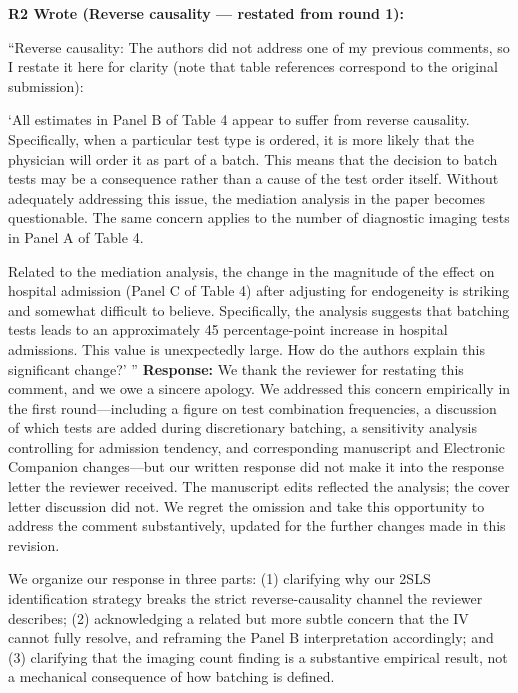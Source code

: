 \documentclass[11pt]{article}
\newenvironment{quote2}
{ \bigskip
\noindent
         \small\em
         \baselineskip=14pt
}
\newcommand{\1}{\hbox{\rm 1\kern-.35em 1}}
\begin{document}
\color{black}

\begin{quote2}
\textbf{R2 Wrote (Reverse causality --- restated from round 1):}

\noindent ``Reverse causality: The authors did not address one of my previous comments, so I restate it here for clarity (note that table references correspond to the original submission):

`All estimates in Panel B of Table 4 appear to suffer from reverse causality. Specifically, when a particular test type is ordered, it is more likely that the physician will order it as part of a batch. This means that the decision to batch tests may be a consequence rather than a cause of the test order itself. Without adequately addressing this issue, the mediation analysis in the paper becomes questionable. The same concern applies to the number of diagnostic imaging tests in Panel A of Table 4.

Related to the mediation analysis, the change in the magnitude of the effect on hospital admission (Panel C of Table 4) after adjusting for endogeneity is striking and somewhat difficult to believe. Specifically, the analysis suggests that batching tests leads to an approximately 45 percentage-point increase in hospital admissions. This value is unexpectedly large. How do the authors explain this significant change?' ''
\end{quote2}
\noindent\textbf{Response:} \color{blue} We thank the reviewer for restating this comment, and we owe a sincere apology. We addressed this concern empirically in the first round---including a figure on test combination frequencies, a discussion of which tests are added during discretionary batching, a sensitivity analysis controlling for admission tendency, and corresponding manuscript and Electronic Companion changes---but our written response did not make it into the response letter the reviewer received. The manuscript edits reflected the analysis; the cover letter discussion did not. We regret the omission and take this opportunity to address the comment substantively, updated for the further changes made in this revision.

We organize our response in three parts: (1) clarifying why our 2SLS identification strategy breaks the strict reverse-causality channel the reviewer describes; (2) acknowledging a related but more subtle concern that the IV cannot fully resolve, and reframing the Panel B interpretation accordingly; and (3) clarifying that the imaging count finding is a substantive empirical result, not a mechanical consequence of how batching is defined.
\end{document}
